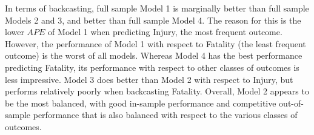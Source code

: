 \documentclass[]{elsarticle} %
\begin{document}
In terms of backcasting, full sample Model 1 is marginally better than
full sample Models 2 and 3, and better than full sample Model 4. The
reason for this is the lower \(APE\) of Model 1 when predicting Injury,
the most frequent outcome. However, the performance of Model 1 with
respect to Fatality (the least frequent outcome) is the worst of all
models. Whereas Model 4 has the best performance predicting Fatality,
its performance with respect to other classes of outcomes is less
impressive. Model 3 does better than Model 2 with respect to Injury, but
performs relatively poorly when backcasting Fatality. Overall, Model 2
appears to be the most balanced, with good in-sample performance and
competitive out-of-sample performance that is also balanced with respect
to the various classes of outcomes.

\begin{table}


\end{table}
\end{document}
